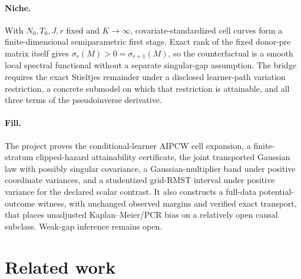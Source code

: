 \documentclass{article}
\begin{document}
\paragraph{Niche.} With \(N_0,T_0,J,r\) fixed and \(K\to\infty\), covariate-standardized cell curves form a finite-dimensional semiparametric first stage. Exact rank of the fixed donor-pre matrix itself gives \(\sigma_r(M)>0=\sigma_{r+1}(M)\), so the counterfactual is a smooth local spectral functional without a separate singular-gap assumption. The bridge requires the exact Stieltjes remainder under a disclosed learner-path variation restriction, a concrete submodel on which that restriction is attainable, and all three terms of the pseudoinverse derivative.

\paragraph{Fill.} The project proves the conditional-learner AIPCW cell expansion, a finite-stratum clipped-hazard attainability certificate, the joint transported Gaussian law with possibly singular covariance, a Gaussian-multiplier band under positive coordinate variances, and a studentized grid-RMST interval under positive variance for the declared scalar contrast. It also constructs a full-data potential-outcome witness, with unchanged observed margins and verified exact transport, that places unadjusted Kaplan--Meier/PCR bias on a relatively open causal subclass. Weak-gap inference remains open.

\section{Related work}
\end{document}
